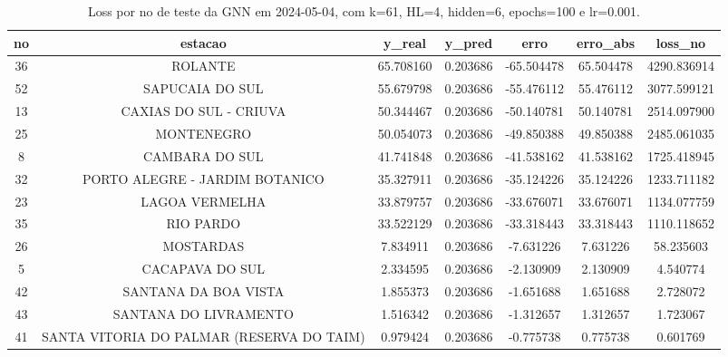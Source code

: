 \begin{table}[h]
\centering
\caption{Loss por no de teste da GNN em 2024-05-04, com k=61, HL=4, hidden=6, epochs=100 e lr=0.001.}
\label{tab:gnn_loss_k61_hl4_h6_e100_d20240504}
\begin{tabular}{ccccccc}
\toprule
no & estacao & y\_real & y\_pred & erro & erro\_abs & loss\_no \\
\midrule
36 & ROLANTE & 65.708160 & 0.203686 & -65.504478 & 65.504478 & 4290.836914 \\
52 & SAPUCAIA DO SUL & 55.679798 & 0.203686 & -55.476112 & 55.476112 & 3077.599121 \\
13 & CAXIAS DO SUL - CRIUVA & 50.344467 & 0.203686 & -50.140781 & 50.140781 & 2514.097900 \\
25 & MONTENEGRO & 50.054073 & 0.203686 & -49.850388 & 49.850388 & 2485.061035 \\
8 & CAMBARA DO SUL & 41.741848 & 0.203686 & -41.538162 & 41.538162 & 1725.418945 \\
32 & PORTO ALEGRE - JARDIM BOTANICO & 35.327911 & 0.203686 & -35.124226 & 35.124226 & 1233.711182 \\
23 & LAGOA VERMELHA & 33.879757 & 0.203686 & -33.676071 & 33.676071 & 1134.077759 \\
35 & RIO PARDO & 33.522129 & 0.203686 & -33.318443 & 33.318443 & 1110.118652 \\
26 & MOSTARDAS & 7.834911 & 0.203686 & -7.631226 & 7.631226 & 58.235603 \\
5 & CACAPAVA DO SUL & 2.334595 & 0.203686 & -2.130909 & 2.130909 & 4.540774 \\
42 & SANTANA DA BOA VISTA & 1.855373 & 0.203686 & -1.651688 & 1.651688 & 2.728072 \\
43 & SANTANA DO LIVRAMENTO & 1.516342 & 0.203686 & -1.312657 & 1.312657 & 1.723067 \\
41 & SANTA VITORIA DO PALMAR (RESERVA DO TAIM) & 0.979424 & 0.203686 & -0.775738 & 0.775738 & 0.601769 \\
\bottomrule
\end{tabular}
\end{table}
